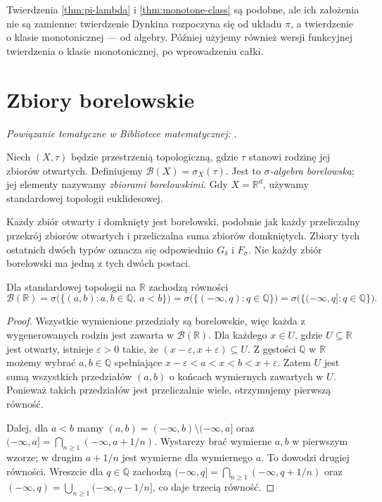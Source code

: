 \begin{uwaga}
Twierdzenia \ref{thm:pi-lambda} i \ref{thm:monotone-class} są podobne,
ale ich założenia nie są zamienne: twierdzenie Dynkina rozpoczyna się
od układu $\pi$, a twierdzenie o klasie monotonicznej --- od algebry.
Później użyjemy również wersji funkcyjnej twierdzenia o klasie
monotonicznej, po wprowadzeniu całki.
\end{uwaga}

\section{Zbiory borelowskie}

\noindent\emph{Powiązanie tematyczne w Bibliotece matematycznej:} .


\begin{definicja}
\label{def:borel}
Niech $(X,\tau)$ będzie przestrzenią topologiczną, gdzie $\tau$
stanowi rodzinę jej zbiorów otwartych. Definiujemy
$\mathcal B(X)=\sigma_X(\tau)$.
Jest to \emph{$\sigma$-algebra borelowska}; jej elementy nazywamy
\emph{zbiorami borelowskimi}. Gdy $X=\mathbb R^d$, używamy standardowej
topologii euklidesowej.
\end{definicja}

Każdy zbiór otwarty i domknięty jest borelowski, podobnie jak każdy
przeliczalny przekrój zbiorów otwartych i przeliczalna suma zbiorów
domkniętych. Zbiory tych ostatnich dwóch typów oznacza się odpowiednio
$G_\delta$ i $F_\sigma$. Nie każdy zbiór borelowski ma jedną z tych
dwóch postaci.

\begin{twierdzenie}
\label{thm:borel-generators-R}
Dla standardowej topologii na $\mathbb R$ zachodzą równości
\[
\mathcal B(\mathbb R)
=\sigma\bigl(\{(a,b):a,b\in\mathbb Q,\ a<b\}\bigr)
=\sigma\bigl(\{(-\infty,q):q\in\mathbb Q\}\bigr)
=\sigma\bigl(\{(-\infty,q]:q\in\mathbb Q\}\bigr).
\]
\end{twierdzenie}
\begin{proof}
Wszystkie wymienione przedziały są borelowskie, więc każda z
wygenerowanych rodzin jest zawarta w $\mathcal B(\mathbb R)$.
Dla każdego $x\in U$, gdzie $U\subseteq\mathbb R$ jest otwarty,
istnieje $\varepsilon>0$ takie, że
$(x-\varepsilon,x+\varepsilon)\subseteq U$.
Z gęstości $\mathbb Q$ w $\mathbb R$ możemy wybrać
$a,b\in\mathbb Q$ spełniające
$x-\varepsilon<a<x<b<x+\varepsilon$.
Zatem $U$ jest sumą wszystkich przedziałów $(a,b)$
o końcach wymiernych zawartych w $U$.
Ponieważ takich przedziałów jest przeliczalnie wiele,
otrzymujemy pierwszą równość.

Dalej, dla $a<b$ mamy $(a,b)=(-\infty,b)\setminus(-\infty,a]$ oraz
$(-\infty,a]=\bigcap_{n\geq1}(-\infty,a+1/n)$.
Wystarczy brać wymierne $a,b$ w pierwszym wzorze; w drugim
$a+1/n$ jest wymierne dla wymiernego $a$. To dowodzi drugiej
równości. Wreszcie dla $q\in\mathbb Q$ zachodzą
$(-\infty,q]=\bigcap_{n\geq1}(-\infty,q+1/n)$ oraz
$(-\infty,q)=\bigcup_{n\geq1}(-\infty,q-1/n]$,
co daje trzecią równość.
\end{proof}

